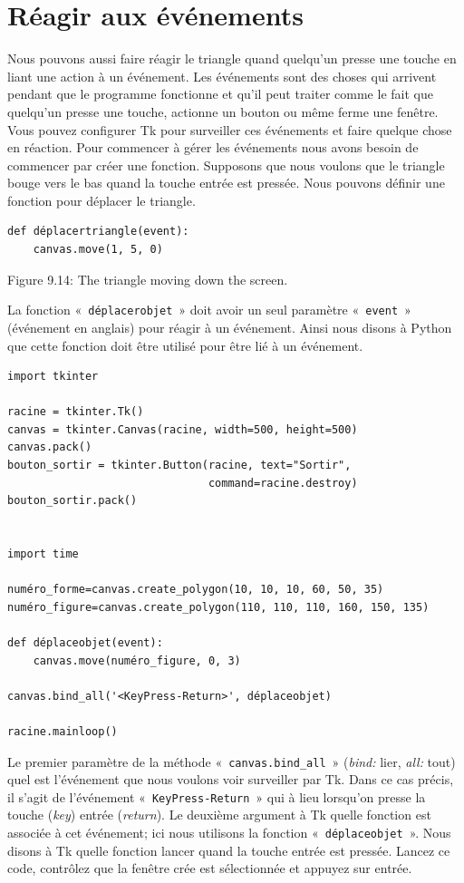 \section{Réagir aux événements}
Nous pouvons aussi faire réagir le triangle quand quelqu'un presse une touche en liant une action à un événement. Les événements sont des choses qui arrivent pendant que le programme fonctionne et qu'il peut traiter comme le fait que quelqu'un presse une touche, actionne un bouton ou même ferme une fenêtre. Vous pouvez configurer Tk pour surveiller ces événements et faire quelque chose en réaction. Pour commencer à gérer les événements nous avons besoin de commencer par créer une fonction. Supposons que nous voulons que le triangle bouge vers le bas quand la touche entrée est pressée. Nous pouvons définir une fonction pour déplacer le triangle.
\begin{Verbatim}[frame=single,rulecolor=\color{gray}, label=ne pas taper]
def déplacertriangle(event):
    canvas.move(1, 5, 0)
\end{Verbatim}


Figure 9.14: The triangle moving down the screen.


La fonction «~\texttt{déplacerobjet}~» doit avoir un seul paramètre «~\texttt{event}~» (événement en anglais) pour réagir à un événement. Ainsi nous disons à Python que cette fonction doit être utilisé pour être lié à un événement.


\begin{Verbatim}[frame=single,rulecolor=\color{mbleu}, label=à taper]
import tkinter

racine = tkinter.Tk()
canvas = tkinter.Canvas(racine, width=500, height=500)
canvas.pack()
bouton_sortir = tkinter.Button(racine, text="Sortir",
                               command=racine.destroy)
bouton_sortir.pack()


import time

numéro_forme=canvas.create_polygon(10, 10, 10, 60, 50, 35)
numéro_figure=canvas.create_polygon(110, 110, 110, 160, 150, 135)

def déplaceobjet(event):
    canvas.move(numéro_figure, 0, 3)

canvas.bind_all('<KeyPress-Return>', déplaceobjet)

racine.mainloop()
\end{Verbatim}

Le premier paramètre de la méthode «~\texttt{canvas.bind\_all}~» (\emph{bind:} lier, \emph{all:} tout) quel est l'événement que nous voulons voir surveiller par Tk. Dans ce cas précis, il s'agit de l'événement «~\texttt{KeyPress-Return}~» qui à lieu lorsqu'on presse la touche (\emph{key}) entrée (\emph{return}). Le deuxième argument à Tk quelle fonction est associée à cet événement; ici nous utilisons la fonction  «~\texttt{déplaceobjet}~». Nous disons à Tk quelle fonction lancer quand la touche entrée est pressée. Lancez ce code, contrôlez que la fenêtre crée est sélectionnée et appuyez sur entrée.

